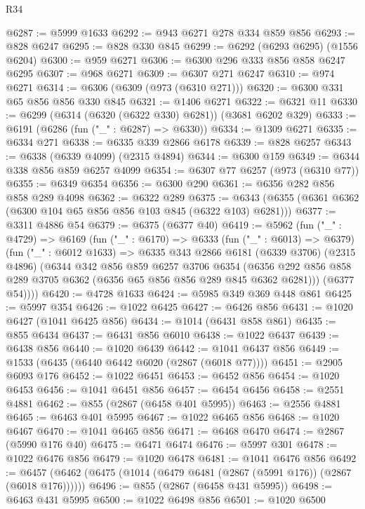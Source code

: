 \begin{lexlean}{R34}
\begin{coremodule}
@6287 := @5999 @1633
@6292 := @943 @6271 @278 @334 @859 @856
@6293 := @828 @6247
@6295 := @828 @330 @845
@6299 := @6292 (@6293 @6295) (@1556 @6204)
@6300 := @959 @6271
@6306 := @6300 @296 @333 @856 @858 @6247 @6295
@6307 := @968 @6271
@6309 := @6307 @271 @6247
@6310 := @974 @6271
@6314 := @6306 (@6309 (@973 (@6310 @271)))
@6320 := @6300 @331 @65 @856 @856 @330 @845
@6321 := @1406 @6271
@6322 := @6321 @11
@6330 := @6299 (@6314 (@6320 (@6322 @330) @6281)) (@3681 @6202 @329)
@6333 := @6191 (@6286 (fun ("_" : @6287) => @6330))
@6334 := @1309 @6271
@6335 := @6334 @271
@6338 := @6335 @339 @2866 @6178
@6339 := @828 @6257
@6343 := @6338 (@6339 @4099) (@2315 @4894)
@6344 := @6300 @159
@6349 := @6344 @338 @856 @859 @6257 @4099
@6354 := @6307 @77 @6257 (@973 (@6310 @77))
@6355 := @6349 @6354
@6356 := @6300 @290
@6361 := @6356 @282 @856 @858 @289 @4098
@6362 := @6322 @289
@6375 := @6343 (@6355 (@6361 @6362 (@6300 @104 @65 @856 @856 @103 @845 (@6322 @103) @6281)))
@6377 := @3311 @4886 @54
@6379 := @6375 (@6377 @40)
@6419 := @5962
    (fun ("_" : @4729) =>
    @6169
      (fun ("_" : @6170) =>
      @6333
        (fun ("_" : @6013) => @6379)
        (fun ("_" : @6012 @1633) =>
        @6335
          @343
          @2866
          @6181
          (@6339 @3706)
          (@2315 @4896)
          (@6344
            @342
            @856
            @859
            @6257
            @3706
            @6354
            (@6356 @292 @856 @858 @289 @3705 @6362 (@6356 @65 @856 @856 @289 @845 @6362 @6281)))
          (@6377 @54))))
@6420 := @4728 @1633
@6424 := @5985 @349 @369 @448 @861
@6425 := @5997 @354
@6426 := @1022 @6425
@6427 := @6426 @856
@6431 := @1020 @6427 (@1041 @6425 @856)
@6434 := @1014 (@6431 @858 @861)
@6435 := @855 @6434
@6437 := @6431 @856 @6010
@6438 := @1022 @6437
@6439 := @6438 @856
@6440 := @1020 @6439
@6442 := @1041 @6437 @856
@6449 := @1533 (@6435 (@6440 @6442 @6020 (@2867 (@6018 @77))))
@6451 := @2905 @6093 @176
@6452 := @1022 @6451
@6453 := @6452 @856
@6454 := @1020 @6453
@6456 := @1041 @6451 @856
@6457 := @6454 @6456
@6458 := @2551 @4881
@6462 := @855 (@2867 (@6458 @401 @5995))
@6463 := @2556 @4881
@6465 := @6463 @401 @5995
@6467 := @1022 @6465 @856
@6468 := @1020 @6467
@6470 := @1041 @6465 @856
@6471 := @6468 @6470
@6474 := @2867 (@5990 @176 @40)
@6475 := @6471 @6474
@6476 := @5997 @301
@6478 := @1022 @6476 @856
@6479 := @1020 @6478
@6481 := @1041 @6476 @856
@6492 := @6457 (@6462 (@6475 (@1014 (@6479 @6481 (@2867 (@5991 @176)) (@2867 (@6018 @176))))))
@6496 := @855 (@2867 (@6458 @431 @5995))
@6498 := @6463 @431 @5995
@6500 := @1022 @6498 @856
@6501 := @1020 @6500

\end{coremodule}
\end{lexlean}
